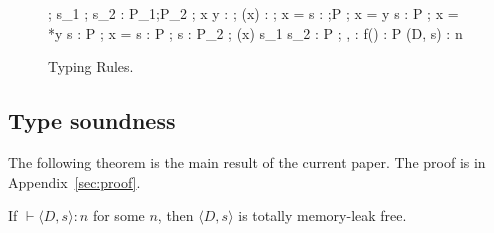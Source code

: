 \begin{figure}[tp]
\begin{minipage}{\textwidth}

{\Theta ; \Gamma \vdash s_{1} ; s_{2} : P_{1};P_{2} }
{\Theta ; \Gamma \vdash *x \leftarrow y :  }
{\Theta ; \Gamma \vdash \Free(x) : \Free}
{\Theta ; \Gamma \vdash \LET x = \MALLOC \; \IN s  : \Malloc;P}
{\Theta ; \Gamma \vdash \LET x = y \; \IN s : P}
{\Theta ; \Gamma \vdash \LET x = *y \; \IN s : P}
{\Theta ; \Gamma \vdash \LET x =  \; \IN s : P}
{\Theta ; \Gamma \vdash s : P_{2}}
{\Theta ; \Gamma \vdash \IFNULL(x) \; \THEN s_{1}\; \ELSE s_{2} : P}
{\Theta; \Gamma,  : \vec{\tau} \vdash f() : P}
{\vdash (D, s) : n}

\end{minipage}
\caption{Typing Rules.}
\label{fig:typingrules}
\end{figure}


\subsection{Type soundness}


The following theorem is the main result of the current paper.  The
proof is in Appendix~\ref{sec:proof}.

\begin{theorem}\label{thm1}
If $\vdash \langle D, s \rangle : n$ for some \(n\), then \(\langle D,
s \rangle\) is totally memory-leak free.
\end{theorem}


